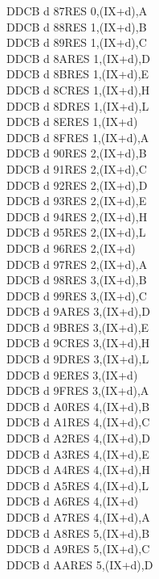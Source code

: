 \begin{multicols}{3}
{\begin{tabbing}
	DDCB d 87\>RES 0,(IX+d),A\UNDOC\\
	DDCB d 88\>RES 1,(IX+d),B\UNDOC\\
	DDCB d 89\>RES 1,(IX+d),C\UNDOC\\
	DDCB d 8A\>RES 1,(IX+d),D\UNDOC\\
	DDCB d 8B\>RES 1,(IX+d),E\UNDOC\\
	DDCB d 8C\>RES 1,(IX+d),H\UNDOC\\
	DDCB d 8D\>RES 1,(IX+d),L\UNDOC\\
	DDCB d 8E\>RES 1,(IX+d)\\
	DDCB d 8F\>RES 1,(IX+d),A\UNDOC\\
	DDCB d 90\>RES 2,(IX+d),B\UNDOC\\
	DDCB d 91\>RES 2,(IX+d),C\UNDOC\\
	DDCB d 92\>RES 2,(IX+d),D\UNDOC\\
	DDCB d 93\>RES 2,(IX+d),E\UNDOC\\
	DDCB d 94\>RES 2,(IX+d),H\UNDOC\\
	DDCB d 95\>RES 2,(IX+d),L\UNDOC\\
	DDCB d 96\>RES 2,(IX+d)\\
	DDCB d 97\>RES 2,(IX+d),A\UNDOC\\
	DDCB d 98\>RES 3,(IX+d),B\UNDOC\\
	DDCB d 99\>RES 3,(IX+d),C\UNDOC\\
	DDCB d 9A\>RES 3,(IX+d),D\UNDOC\\
	DDCB d 9B\>RES 3,(IX+d),E\UNDOC\\
	DDCB d 9C\>RES 3,(IX+d),H\UNDOC\\
	DDCB d 9D\>RES 3,(IX+d),L\UNDOC\\
	DDCB d 9E\>RES 3,(IX+d)\\
	DDCB d 9F\>RES 3,(IX+d),A\UNDOC\\
	DDCB d A0\>RES 4,(IX+d),B\UNDOC\\
	DDCB d A1\>RES 4,(IX+d),C\UNDOC\\
	DDCB d A2\>RES 4,(IX+d),D\UNDOC\\
	DDCB d A3\>RES 4,(IX+d),E\UNDOC\\
	DDCB d A4\>RES 4,(IX+d),H\UNDOC\\
	DDCB d A5\>RES 4,(IX+d),L\UNDOC\\
	DDCB d A6\>RES 4,(IX+d)\\
	DDCB d A7\>RES 4,(IX+d),A\UNDOC\\
	DDCB d A8\>RES 5,(IX+d),B\UNDOC\\
	DDCB d A9\>RES 5,(IX+d),C\UNDOC\\
	DDCB d AA\>RES 5,(IX+d),D\UNDOC\\

\end{tabbing}}
\end{multicols}
